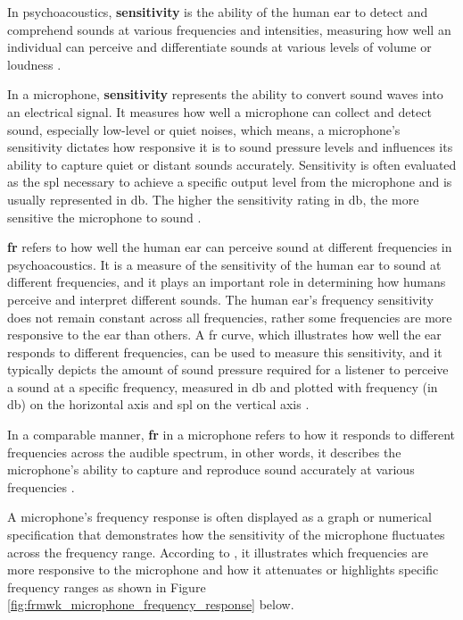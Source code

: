 In psychoacoustics, \textbf{sensitivity} is the ability of the human ear to detect and comprehend sounds at various frequencies and intensities, measuring how well an individual can perceive and differentiate sounds at various levels of volume or loudness \cite{Moore2013}.

In a microphone, \textbf{sensitivity} represents the ability to convert sound waves into an electrical signal. It measures how well a microphone can collect and detect sound, especially low-level or quiet noises, which means, a microphone's sensitivity dictates how responsive it is to sound pressure levels and influences its ability to capture quiet or distant sounds accurately. Sensitivity is often evaluated as the \gls{spl} necessary to achieve a specific output level from the microphone and is usually represented in \gls{db}. The higher the sensitivity rating in \gls{db}, the more sensitive the microphone to sound \cite{Rayburn2004}.

\textbf{\gls{fr}} refers to how well the human ear can perceive sound at different frequencies in psychoacoustics. It is a measure of the sensitivity of the human ear to sound at different frequencies, and it plays an important role in determining how humans perceive and interpret different sounds. The human ear's frequency sensitivity does not remain constant across all frequencies, rather some frequencies are more responsive to the ear than others. A \gls{fr} curve, which illustrates how well the ear responds to different frequencies, can be used to measure this sensitivity, and it typically depicts the amount of sound pressure required for a listener to perceive a sound at a specific frequency, measured in \gls{db} and plotted with frequency (in \gls{db}) on the horizontal axis and \gls{spl} on the vertical axis \cite{Moore2013}.

In a comparable manner, \textbf{\gls{fr}} in a microphone refers to how it responds to different frequencies across the audible spectrum, in other words, it describes the microphone's ability to capture and reproduce sound accurately at various frequencies \cite{Rayburn2004}.

A microphone's frequency response is often displayed as a graph or numerical specification that demonstrates how the sensitivity of the microphone fluctuates across the frequency range. According to \textcite{Rayburn2004}, it illustrates which frequencies are more responsive to the microphone and how it attenuates or highlights specific frequency ranges as shown in Figure \ref{fig:frmwk_microphone_frequency_response} below.

